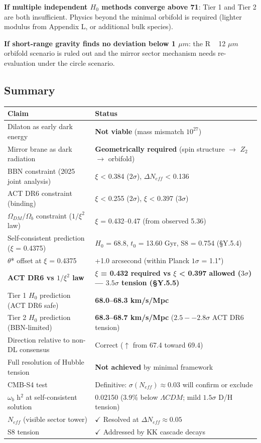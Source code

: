 \documentclass[aps,prd,preprint,superscriptaddress,longbibliography,floatfix]{revtex4-2}
\theoremstyle{remark}
\begin{document}
\textbf{If multiple independent $H_{0}$ methods converge above 71}: Tier 1 and Tier 2 are both insufficient. Physics beyond the minimal orbifold is required (lighter modulus from Appendix L, or additional bulk species).

\textbf{If short-range gravity finds no deviation below 1 $\mu m$}: the R ~ 12 $\mu m$ orbifold scenario is ruled out and the mirror sector mechanism needs re-evaluation under the circle scenario.



\subsection{Summary}


\begin{table}[H]
\begin{ruledtabular}
\begin{tabular}{p{7.5cm}p{7.5cm}}
Claim & Status \\
\hline
Dilaton as early dark energy & \textbf{Not viable} (mass mismatch $10^{27}$) \\
Mirror brane as dark radiation & \textbf{Geometrically required} (spin structure $\to$ $Z_{2}$ $\to$ orbifold) \\
BBN constraint (2025 joint analysis) & $\xi$ < 0.384 ($2\sigma$), $\Delta N_{eff}$ < 0.136 \\
ACT DR6 constraint (binding) & $\xi$ < 0.255 ($2\sigma$), $\xi$ < 0.397 ($3\sigma$) \\
$\Omega_{DM}/\Omega_b$ constraint ($1/\xi^{2}$ law) & $\xi$ = 0.432--0.47 (from observed 5.36) \\
Self-consistent prediction ($\xi$ = 0.4375) & $H_{0}$ = 68.8, $t_{0}$ = 13.60 Gyr, S8 = 0.754 (\S{}Y.5.4) \\
$\theta$* offset at $\xi$ = 0.4375 & +1.0 arcsecond (within Planck $1\sigma$ = 1.1") \\
\textbf{ACT DR6 vs $1/\xi^{2}$ law} & \textbf{$\xi$ = 0.432 required vs $\xi$ < 0.397 allowed ($3\sigma$) --- $3.5\sigma$ tension (\S{}Y.5.5)} \\
Tier 1 $H_{0}$ prediction (ACT DR6 safe) & \textbf{68.0--68.3 km/s/Mpc} \\
Tier 2 $H_{0}$ prediction (BBN-limited) & \textbf{68.3--68.7 km/s/Mpc} ($2.5--2.8\sigma$ ACT DR6 tension) \\
Direction relative to non-DL consensus & Correct ($\uparrow$ from 67.4 toward 69.4) \\
Full resolution of Hubble tension & \textbf{Not achieved} by minimal framework \\
CMB-S4 test & Definitive: $\sigma(N_{eff}) \approx 0.03$ will confirm or exclude \\
$\omega_b$ h$^{2}$ at self-consistent solution & 0.02150 (3.9\% below $\Lambda CDM$; mild $1.5\sigma$ D/H tension) \\
$N_{eff}$ (visible sector tower) & $\checkmark$ Resolved at $\Delta N_{eff} \approx 0.05$ \\
S8 tension & $\checkmark$ Addressed by KK cascade decays \\
\end{tabular}
\end{ruledtabular}
\end{table}
\end{document}
